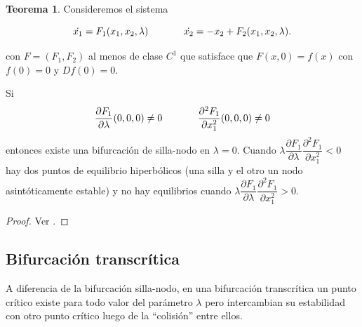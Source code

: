 \documentclass[11pt]{book}
\theoremstyle{definition}
\numberwithin{definition}{section}
\theoremstyle{theorem}
\newtheorem{theorem}{Teorema}
\numberwithin{theorem}{section}
\numberwithin{lemma}{section}
\numberwithin{corollary}{section}
\theoremstyle{plain}
\numberwithin{example}{section}
\begin{document}
\begin{theorem}Consideremos el sistema

$$ \dot{x_1} = F_1(x_1, x_2, \lambda) \hspace{0.5in} \dot{x_2} = -x_2 + F_2(x_1, x_2, \lambda). $$

con $F=(F_1,F_2)$ al menos de clase $C^1$ que satisface que $F(x,0) = f(x)$ con $f(0) = 0$ y $Df(0) = 0$.

Si
$$
	\dfrac{\partial F_1}{\partial \lambda}(0,0,0) \neq 0 \hspace{0.5in}
	\dfrac{\partial^2 F_1}{\partial x_1^2}(0,0,0) \neq 0	
$$
entonces existe una bifurcación de silla-nodo en $\lambda = 0$.
Cuando $\lambda \dfrac{\partial F_1}{\partial \lambda} \dfrac{\partial^2 F_1}{\partial x_1^2} < 0$ hay dos puntos de equilibrio hiperbólicos (una silla y el otro un nodo asintóticamente estable) y no hay equilibrios cuando $\lambda \dfrac{\partial F_1}{\partial \lambda} \dfrac{\partial^2 F_1}{\partial x_1^2} > 0$.
\begin{proof}
Ver \cite[p.~316]{dynandbif}.
\end{proof}
\end{theorem}


\subsection{Bifurcación transcrítica}

A diferencia de la bifurcación silla-nodo, en una bifurcación transcrítica un punto crítico existe para todo valor del parámetro $\lambda$ pero intercambian su estabilidad con otro punto crítico luego de la ``colisión'' entre ellos.
\end{document}
